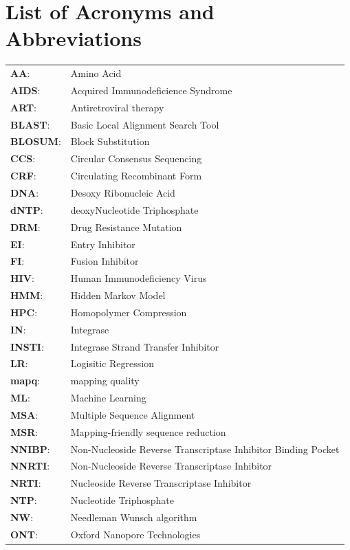 \documentclass[
  11pt,
  twoside,
  BCOR=10mm,
  listof=totoc]{scrbook}
\begin{document}
\chapter{List of Acronyms and Abbreviations}
\begin{tabular}{ll}
\textbf{AA}:& Amino Acid\\
\textbf{AIDS}:& Acquired Immunodeficience Syndrome\\
\textbf{ART}:& Antiretroviral therapy\\
\textbf{BLAST}:& Basic Local Alignment Search Tool\\
\textbf{BLOSUM}:& Block Substitution\\
\textbf{CCS}:& Circular Consensus Sequencing\\
\textbf{CRF}:& Circulating Recombinant Form\\
\textbf{DNA}:& Desoxy Ribonucleic Acid\\
\textbf{dNTP}:& deoxyNucleotide Triphosphate\\
\textbf{DRM}:& Drug Resistance Mutation\\
\textbf{EI}:& Entry Inhibitor\\
\textbf{FI}:& Fusion Inhibitor\\
\textbf{HIV}:& Human Immunodeficiency Virus\\
\textbf{HMM}:& Hidden Markov Model\\
\textbf{HPC}:& Homopolymer Compression\\
\textbf{IN}:& Integrase\\
\textbf{INSTI}:& Integrase Strand Transfer Inhibitor\\
\textbf{LR}:& Logisitic Regression\\
\textbf{mapq}:& mapping quality\\
\textbf{ML}:& Machine Learning\\
\textbf{MSA}:& Multiple Sequence Alignment\\
\textbf{MSR}:& Mapping-friendly sequence reduction\\
\textbf{NNIBP}:& Non-Nucleoside Reverse Transcriptase Inhibitor Binding Pocket\\
\textbf{NNRTI}:& Non-Nucleoside Reverse Transcriptase Inhibitor\\
\textbf{NRTI}:& Nucleoside Reverse Transcriptase Inhibitor\\
\textbf{NTP}:& Nucleotide Triphosphate\\
\textbf{NW}:& Needleman Wunsch algorithm\\
\textbf{ONT}:& Oxford Nanopore Technologies\\

\end{tabular}
\end{document}
